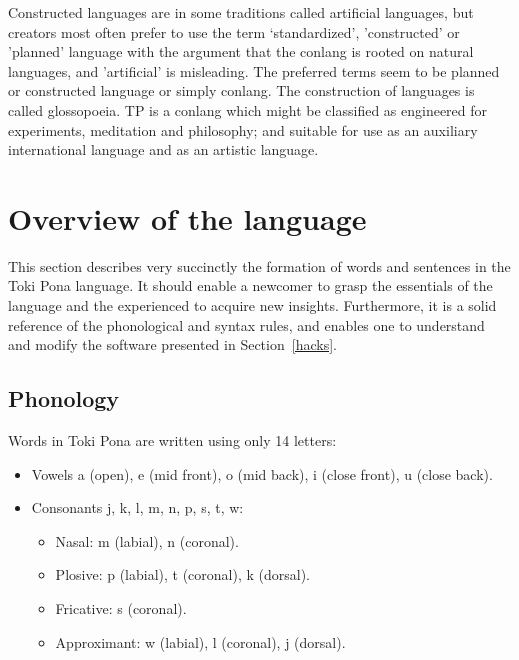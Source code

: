 Constructed languages are in some traditions called artificial
languages, but creators most often prefer to use the term
`standardized', 'constructed'
or 'planned' language with the argument that the conlang
is rooted on natural languages,
and 'artificial' is misleading.
The preferred terms seem to be planned or constructed language
or simply conlang.
The construction of languages is called glossopoeia.
TP is a conlang which might be classified
as engineered for experiments, meditation and philosophy;
and suitable for use as an auxiliary international language and
as an artistic language.~\cite{conlanWikip,artlanWikip}



\section{Overview of the language}\label{basics}
This section describes very succinctly the formation of
words and sentences in the Toki Pona language.
It should enable a newcomer to grasp the essentials
of the language and the experienced to
acquire new insights.
Furthermore, it is a solid reference of the phonological and syntax
rules, and enables one to understand and modify the software presented
in Section~\ref{hacks}.

\subsection{Phonology}\label{phonology}
Words in Toki Pona are written using only 14 letters:
\begin{itemize}
  \item Vowels a (open), e (mid front), o (mid back), i (close front),
    u (close back).
  \item Consonants j, k, l, m, n, p, s, t, w:
    \begin{itemize}
      \item Nasal: m (labial), n (coronal).
      \item Plosive: p (labial), t (coronal), k (dorsal).
      \item Fricative: s (coronal).
      \item Approximant: w (labial), l (coronal), j (dorsal).
    \end{itemize}
\end{itemize}

